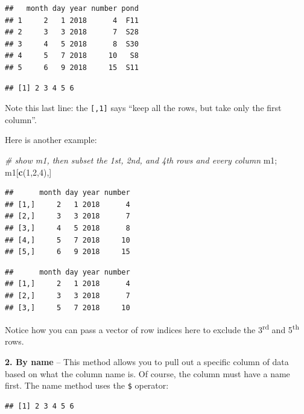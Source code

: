 \documentclass[]{book}
\newenvironment{Shaded}{\begin{snugshade}}{\end{snugshade}}
\newcommand{\KeywordTok}[1]{\textcolor[rgb]{0.13,0.29,0.53}{\textbf{#1}}}
\newcommand{\DecValTok}[1]{\textcolor[rgb]{0.00,0.00,0.81}{#1}}
\newcommand{\CommentTok}[1]{\textcolor[rgb]{0.56,0.35,0.01}{\textit{#1}}}
\newcommand{\OperatorTok}[1]{\textcolor[rgb]{0.81,0.36,0.00}{\textbf{#1}}}
\newcommand{\NormalTok}[1]{#1}
\theoremstyle{definition}
\theoremstyle{definition}
\theoremstyle{definition}
\theoremstyle{remark}
\begin{document}
\begin{verbatim}
##   month day year number pond
## 1     2   1 2018      4  F11
## 2     3   3 2018      7  S28
## 3     4   5 2018      8  S30
## 4     5   7 2018     10   S8
## 5     6   9 2018     15  S11
\end{verbatim}

\begin{verbatim}
## [1] 2 3 4 5 6
\end{verbatim}

Note this last line: the \texttt{{[},1{]}} says ``keep all the rows, but
take only the first column''.

Here is another example:

\begin{Shaded}
\begin{Highlighting}[]
\CommentTok{# show m1, then subset the 1st, 2nd, and 4th rows and every column}
\NormalTok{m1; m1[}\KeywordTok{c}\NormalTok{(}\DecValTok{1}\NormalTok{,}\DecValTok{2}\NormalTok{,}\DecValTok{4}\NormalTok{),]}
\end{Highlighting}
\end{Shaded}

\begin{verbatim}
##      month day year number
## [1,]     2   1 2018      4
## [2,]     3   3 2018      7
## [3,]     4   5 2018      8
## [4,]     5   7 2018     10
## [5,]     6   9 2018     15
\end{verbatim}

\begin{verbatim}
##      month day year number
## [1,]     2   1 2018      4
## [2,]     3   3 2018      7
## [3,]     5   7 2018     10
\end{verbatim}

Notice how you can pass a vector of row indices here to exclude the
3\textsuperscript{rd} and 5\textsuperscript{th} rows.

\textbf{2. By name} -- This method allows you to pull out a specific
column of data based on what the column name is. Of course, the column
must have a name first. The name method uses the \texttt{\$} operator:

\begin{Shaded}
\end{Shaded}

\begin{verbatim}
## [1] 2 3 4 5 6
\end{verbatim}
\end{document}
